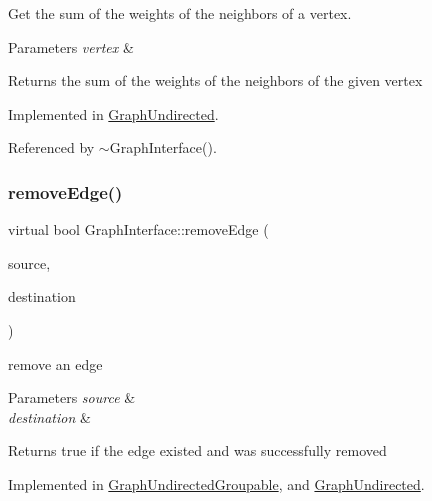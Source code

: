 Get the sum of the weights of the neighbors of a vertex. 


\begin{DoxyParams}{Parameters}
{\em vertex} & \\
\hline
\end{DoxyParams}
\begin{DoxyReturn}{Returns}
the sum of the weights of the neighbors of the given vertex 
\end{DoxyReturn}


Implemented in \hyperlink{classGraphUndirected_a5bc804358a7bc0087953023c597a621b}{Graph\+Undirected}.



Referenced by $\sim$\+Graph\+Interface().

\mbox{\label{classGraphInterface_a1297fd6d7c9698197b5f570f2a9f3701}} 
\subsubsection{\texorpdfstring{remove\+Edge()}{removeEdge()}\hspace{0.1cm}{\footnotesize\ttfamily [1/2]}}
{\footnotesize\ttfamily virtual bool Graph\+Interface\+::remove\+Edge (\begin{DoxyParamCaption}\item[{const \hyperlink{edge_8h_a5fbd20c46956d479cb10afc9855223f6}{type\+Vertex} \&}]{source,  }\item[{const \hyperlink{edge_8h_a5fbd20c46956d479cb10afc9855223f6}{type\+Vertex} \&}]{destination }\end{DoxyParamCaption})\hspace{0.3cm}{\ttfamily [pure virtual]}}

remove an edge


\begin{DoxyParams}{Parameters}
{\em source} & \\
\hline
{\em destination} & \\
\hline
\end{DoxyParams}
\begin{DoxyReturn}{Returns}
true if the edge existed and was successfully removed 
\end{DoxyReturn}


Implemented in \hyperlink{classGraphUndirectedGroupable_ad1a488cc292d7e63d289f598aeaaacd6}{Graph\+Undirected\+Groupable}, and \hyperlink{classGraphUndirected_af4a40541132a66c9b688a20958057751}{Graph\+Undirected}.



